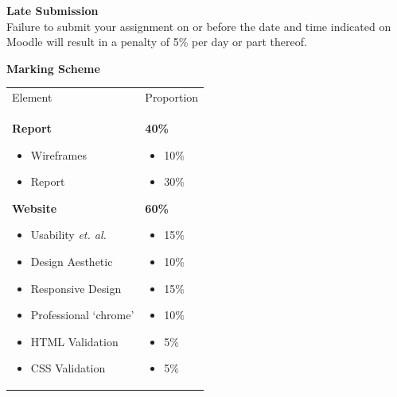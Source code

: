\textbf{Late Submission}\\
Failure to submit your assignment on or before the date and time indicated on Moodle will result in a penalty of 5\% per day or part thereof.

\vspace{0.5cm}
\newpage
\textbf{Marking Scheme}\\


\begin{table}[h!]
     \begin{center}
     \begin{tabular}{p{5cm}  p{5cm} }
     \toprule
      \textbf\large{Element} & \textbf\large{Proportion} \\ 
    \cmidrule(r){1-1}\cmidrule(lr){2-2}
      \textbf{Report}
		      \begin{itemize}[topsep=0pt]
		      		\item[] Wireframes
		      		\item[] Report 
		      \end{itemize}
      \textbf{Website}
            	\begin{itemize}[topsep=0pt]
			      \item[] Usability \emph{et. al.}
			      \item[] Design Aesthetic
			      \item[] Responsive Design
			      \item[] Professional `chrome'
			      \item[] HTML Validation
			      \item[] CSS Validation 
      			\end{itemize}
      & 
      \textbf{40\%}
		      \begin{itemize}[topsep=0pt]
		      \item[] 10\%
		      \item[] 30\%
		      \end{itemize}
      \textbf{60\%}
            \begin{itemize}[topsep=0pt]
			      \item[] 15\%
			      \item[] 10\%
			      \item[] 15\%
			      \item[] 10\%
				  \item[] 5\%
				  \item[] 5\%		      
      		\end{itemize}
      \\ \bottomrule
      \end{tabular}
      \label{tbl:markSchemeAsmt2}
      \end{center}
 \end{table}
  


